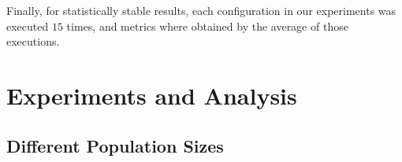 \documentclass[12pt]{article}
\begin{document}
Finally, for statistically stable results, each configuration in our experiments was executed $15$ times, and metrics where obtained by the average of those executions.



\section{Experiments and Analysis}
%
%
%


\subsection{Different Population Sizes}
\end{document}
